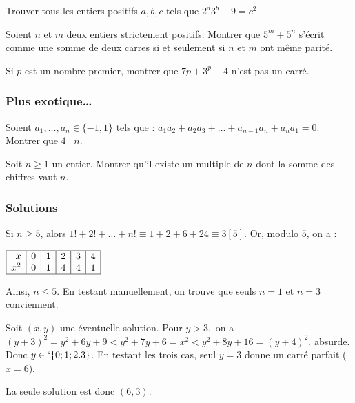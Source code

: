 \begin{exo}
Trouver tous les entiers positifs $a,b,c$ tels que $2^a3^b+9=c^2$
\end{exo}


\begin{exo}
Soient $n$ et $m$ deux entiers strictement positifs. Montrer que $5^m + 5^n$ s’écrit comme une
somme de deux carres si et seulement si $n$ et $m$ ont même parité.
\end{exo}



\begin{exo} Si $p$ est un nombre premier, montrer que $7p+3^p-4$ n'est pas un carré.
\end{exo}


\subsubsection{Plus exotique…}


\begin{exo} Soient $a_1,\dots,a_n \in \{-1,1\}$ tels que : $a_1a_2+a_2a_3+\dots+a_{n-1}a_n+a_na_1=0$.
Montrer que $4\mid n$.
\end{exo}


\begin{exo}
Soit $n\ge1$ un entier. Montrer qu'il existe un multiple de $n$ dont la somme des chiffres vaut $n$.
\end{exo}


\subsubsection{Solutions}


\begin{sol} Si $n\ge5$, alors $ 1!+2!+\ldots+n!\equiv 1+2+6+24\equiv 3 [5]$.
Or, modulo $5$, on a :
\begin{center}
$\begin{array}{|r|c|c|c|c|l|}
\hline
x & 0 & 1 & 2 & 3 & 4 \\
x^2 & 0 & 1 & 4 & 4 & 1 \\
\hline
\end{array}$
\end{center}
Ainsi, $n\le5$. En testant manuellement, on trouve que seuls $n=1$ et $n=3$ conviennent.
\end{sol}


\begin{sol}
Soit $(x,y)$ une éventuelle solution.
Pour $y>3,$ on a $(y+3)^2=y^2+6y+9<y^2+7y+6=x^2<y^2+8y+16=(y+4)^2$, absurde.
Donc $y\in`\{0;1;2.3\}$. En testant les trois cas, seul $y=3$ donne un carré parfait ($x=6$).

La seule solution est donc $(6,3)$.
\end{sol}


